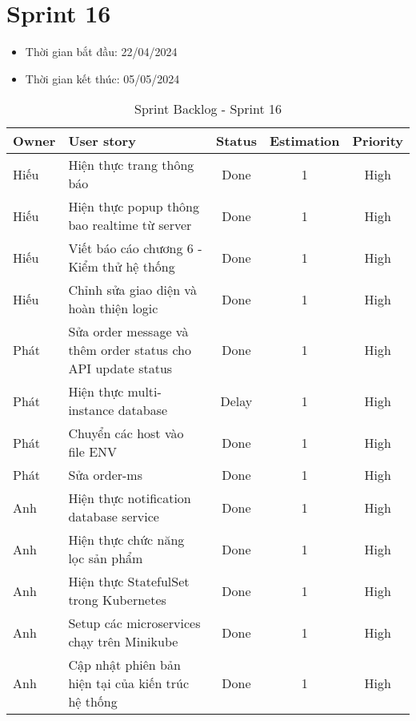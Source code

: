 \section{Sprint 16}
\begin{itemize}
    \item Thời gian bắt đầu: 22/04/2024
    \item Thời gian kết thúc: 05/05/2024
\end{itemize}
\begin{table}[H]
    \begin{tabular}{|m{2.5cm}|m{6cm}|c|c|c|}
    \hline
    \textbf{Owner}  & \textbf{User story}                                & \textbf{Status} & \textbf{Estimation} & \textbf{Priority} \\ \hline
    Hiếu                & Hiện thực trang thông báo                 & Done            & 1                   & High         \\ \hline
    Hiếu               & Hiện thực popup thông bao realtime từ server                 & Done            & 1                   & High         \\ \hline
    Hiếu                & Viết báo cáo chương 6 - Kiểm thử hệ thống                 & Done            & 1                   & High         \\ \hline
    Hiếu               & Chỉnh sửa giao diện và hoàn thiện logic                 & Done            & 1                   & High         \\ \hline
    Phát               & Sửa order message và thêm order status cho API update status                 & Done            & 1                   & High         \\ \hline
    Phát               & Hiện thực multi-instance database                & Delay            & 1                   & High         \\ \hline
    Phát              & Chuyển các host vào file ENV                & Done            & 1                   & High         \\ \hline
    Phát              & Sửa order-ms                 & Done            & 1                   & High         \\ \hline
    Anh               & Hiện thực notification database service                 & Done            & 1                   & High         \\ \hline
    Anh               & Hiện thực chức năng lọc sản phẩm                 & Done            & 1                   & High         \\ \hline
    Anh              & Hiện thực StatefulSet trong Kubernetes                & Done            & 1                   & High         \\ \hline
    Anh              & Setup các microservices chạy trên Minikube                & Done            & 1                   & High         \\ \hline
    Anh               & Cập nhật phiên bản hiện tại của kiến trúc hệ thống                & Done            & 1                   & High         \\ \hline
    \end{tabular}
    \caption{Sprint Backlog - Sprint 16}
    \label{tab:sprint-16}
\end{table}
